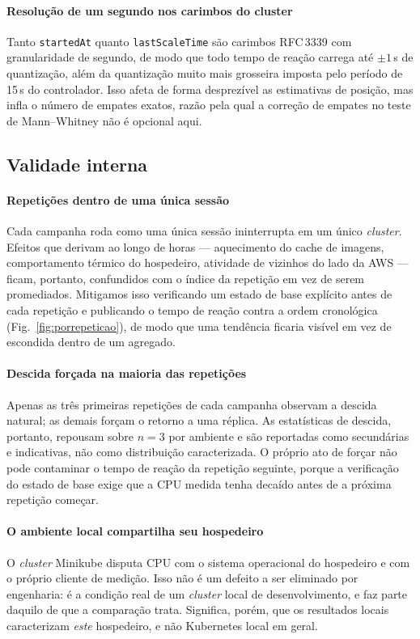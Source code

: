\documentclass[conference]{IEEEtran}
\begin{document}
\paragraph{Resolução de um segundo nos carimbos do cluster} Tanto
\texttt{startedAt} quanto \texttt{lastScaleTime} são carimbos RFC\,3339 com
granularidade de segundo, de modo que todo tempo de reação carrega até $\pm1$\,s
de quantização, além da quantização muito mais grosseira imposta pelo período de
15\,s do controlador. Isso afeta de forma desprezível as estimativas de posição,
mas infla o número de empates exatos, razão pela qual a correção de empates no
teste de Mann--Whitney não é opcional aqui.

\subsection{Validade interna}

\paragraph{Repetições dentro de uma única sessão} Cada campanha roda como uma
única sessão ininterrupta em um único \emph{cluster}. Efeitos que derivam ao
longo de horas --- aquecimento do cache de imagens, comportamento térmico do
hospedeiro, atividade de vizinhos do lado da AWS --- ficam, portanto, confundidos
com o índice da repetição em vez de serem promediados. Mitigamos isso verificando
um estado de base explícito antes de cada repetição e publicando o tempo de
reação contra a ordem cronológica (Fig.~\ref{fig:porrepeticao}), de modo que uma
tendência ficaria visível em vez de escondida dentro de um agregado.

\paragraph{Descida forçada na maioria das repetições} Apenas as três primeiras
repetições de cada campanha observam a descida natural; as demais forçam o
retorno a uma réplica. As estatísticas de descida, portanto, repousam sobre
$n=3$ por ambiente e são reportadas como secundárias e indicativas, não como
distribuição caracterizada. O próprio ato de forçar não pode contaminar o tempo
de reação da repetição seguinte, porque a verificação do estado de base exige que
a CPU medida tenha decaído antes de a próxima repetição começar.

\paragraph{O ambiente local compartilha seu hospedeiro} O \emph{cluster} Minikube
disputa CPU com o sistema operacional do hospedeiro e com o próprio cliente de
medição. Isso não é um defeito a ser eliminado por engenharia: é a condição real
de um \emph{cluster} local de desenvolvimento, e faz parte daquilo de que a
comparação trata. Significa, porém, que os resultados locais caracterizam
\emph{este} hospedeiro, e não Kubernetes local em geral.
\end{document}
